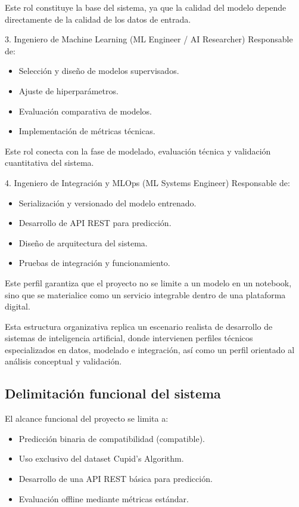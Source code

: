 Este rol constituye la base del sistema, ya que la calidad del modelo depende directamente de la calidad de los datos de entrada.

3. Ingeniero de Machine Learning (ML Engineer / AI Researcher)
 Responsable de:

\begin{itemize}
    \item Selección y diseño de modelos supervisados.
    \item Ajuste de hiperparámetros.
    \item Evaluación comparativa de modelos.
    \item Implementación de métricas técnicas.
\end{itemize}

Este rol conecta con la fase de modelado, evaluación técnica y validación cuantitativa del sistema.

4. Ingeniero de Integración y MLOps (ML Systems Engineer)
 Responsable de:

\begin{itemize}
    \item Serialización y versionado del modelo entrenado.
    \item Desarrollo de API REST para predicción.
    \item Diseño de arquitectura del sistema.
    \item Pruebas de integración y funcionamiento.
\end{itemize}

Este perfil garantiza que el proyecto no se limite a un modelo en un notebook, sino que se materialice como un servicio integrable dentro de una plataforma digital.

Esta estructura organizativa replica un escenario realista de desarrollo de sistemas de inteligencia artificial, donde intervienen perfiles técnicos especializados en datos, modelado e integración, así como un perfil orientado al análisis conceptual y validación.

\subsection{Delimitación funcional del sistema}
El alcance funcional del proyecto se limita a:

\begin{itemize}
    \item Predicción binaria de compatibilidad (compatible).
    \item Uso exclusivo del dataset Cupid’s Algorithm.
    \item Desarrollo de una API REST básica para predicción.
    \item Evaluación offline mediante métricas estándar.
\end{itemize}

